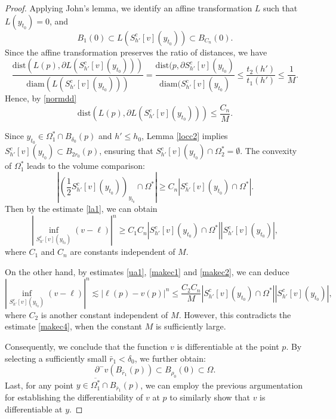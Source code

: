 \documentclass[11pt]{amsart}
\theoremstyle{plain}
\newcommand{\0}{\textbf{0}}
\numberwithin{equation}{section}
\numberwithin{equation}{section}
\numberwithin{figure}{section}
\begin{document}
\begin{proof}
Applying John's lemma, we identify an affine transformation \(L\) such that \(L(y_{t_0}) = 0\), and 
\begin{equation}\label{normdd}
B_1(0) \subset L\left(S^c_{h'}[v](y_{t_0})\right) \subset B_{C_n}(0).
\end{equation}
Since the affine transformation preserves the ratio of distances, we have
	\[ \frac{\text{dist}\left(L(p), \partial L\left(S^c_{h'}[v](y_{t_0})\right)\right) }{\text{diam}(L\left(S^c_{h'}[v](y_{t_0})\right))} = \frac{\text{dist}(p,\partial S^c_{h'}[v](y_{t_0})}{\text{diam}(S^c_{h'}[v](y_{t_0})} \leq \frac{t_2(h')}{t_1(h')} \leq \frac{1}{M}.\]
Hence, by \eqref{normdd}
\begin{equation}\label{makec2}
\text{dist}\left(L(p), \partial L\left(S^c_{h'}[v](y_{t_0})\right)\right)   \leq \frac{C_n}{M}.
\end{equation}

Since \(y_{t_0} \in \Omega_1^* \cap B_{\delta_0}(p)\) and \(h' \leq h_0\), Lemma \ref{locc2} implies \(S^c_{h'}[v](y_{t_0}) \subset B_{2r_0}(p)\), ensuring that \(S^c_{h'}[v](y_{t_0}) \cap \Omega_2^* = \emptyset\). 
The convexity of $\Omega^*_1$ leads to the volume comparison:
\begin{equation}\label{makec3}
\left| \left(\frac{1}{2}S^c_{h'}[v](y_{t_0})\right)_{y_{t_0}} \cap \Omega^* \right| \geq C_n \left| S^c_{h'}[v](y_{t_0}) \cap \Omega^* \right|.
\end{equation}
Then by the estimate \eqref{la1}, we can obtain
\begin{equation}\label{makec4}
 \left|\inf_{S^c_{h'}[v](y_{t_0})} (v-\ell)\right|^n \geq C_1 C_n |S^c_{h'}[v](y_{t_0}) \cap \Omega^*| |S^c_{h'}[v](y_{t_0})|,
\end{equation}
where \(C_1\) and \(C_n\) are constants independent of \( M \).

On the other hand, by estimates \eqref{ua1}, \eqref{makec1} and \eqref{makec2}, we can deduce
\begin{equation}
 \left|\inf_{S^c_{h'}[v](y_{t_0})} (v-\ell)\right|^n \lesssim |\ell(p)-v(p)|^n \leq \frac{C_2 C_n}{M} |S^c_{h'}[v](y_{t_0}) \cap \Omega^*| |S^c_{h'}[v](y_{t_0})|,
\end{equation}
where \(C_2\) is another constant  independent of \( M \).
However, this contradicts the estimate \eqref{makec4}, when the constant \(M\) is sufficiently large. 

Consequently, we conclude that the function \(v\) is differentiable at the point \(p\). By selecting a sufficiently small \(\bar r_1 < \delta_0\), we further obtain:
\begin{equation}\label{newextend1}
\partial^{-}v(B_{\bar r_1}(p)) \subset B_{\rho_0}(0) \subset \Omega.
\end{equation}
Last, for any point \(y \in \overline{\Omega_1^*} \cap B_{\bar r_1}(p)\), we can employ the previous argumentation for establishing the differentiability of \(v\) at \(p\) to similarly show that \(v\) is differentiable at \(y\).
\end{proof}
\end{document}

